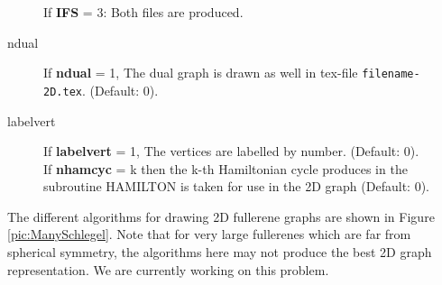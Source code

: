 \documentclass[article,a4paper,twoside]{memoir}
\newcommand{\filename}[1]{\texttt{#1}}
\newcommand{\paramname}[1]{{\color{green}\textbf{#1}}}
\begin{document}
\begin{description}
If \paramname{IFS} = 3: Both files are produced.
\item[ndual] 
If \paramname{ndual} = 1, The dual graph is drawn as well in tex-file \filename{filename-2D.tex}. (Default: 0).\\
\item[labelvert] 
If \paramname{labelvert} = 1, The vertices are labelled by number. (Default: 0).\\
If \paramname{nhamcyc} = k then the k-th Hamiltonian cycle produces in the subroutine HAMILTON is taken for use in
the 2D graph (Default: 0).\\
\end{description}

The different algorithms for drawing 2D fullerene graphs are shown in Figure \ref{pic:ManySchlegel}. Note that for very large
fullerenes which are far from spherical symmetry, the algorithms here may not produce the best 2D graph representation.
We are currently working on this problem.


\clearpage
\end{document}
